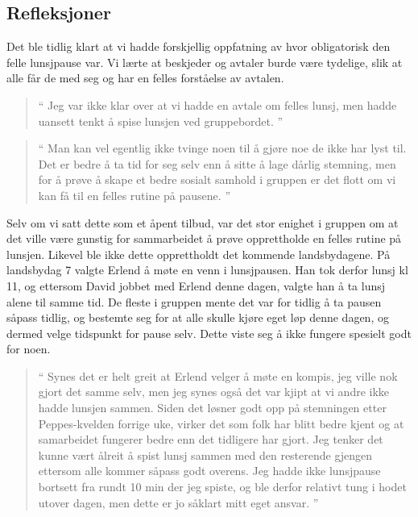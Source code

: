 \subsection*{Refleksjoner}
Det ble tidlig klart at vi hadde forskjellig oppfatning av hvor obligatorisk den felle lunsjpause var. Vi lærte at beskjeder og avtaler burde være tydelige, slik at alle får de med seg og har en felles forståelse av avtalen. 


\begin{quote}``
Jeg var ikke klar over at vi hadde en avtale om felles lunsj, men hadde uansett tenkt å spise lunsjen ved gruppebordet.
''\end{quote} 

\begin{quote}``
Man kan vel egentlig ikke tvinge noen til å gjøre noe de ikke har lyst til. Det er bedre å ta tid for seg selv enn å sitte å lage dårlig stemning, men for å prøve å skape et bedre sosialt samhold i gruppen er det flott om vi kan få til en felles rutine på pausene.
''\end{quote} 



Selv om vi satt dette som et åpent tilbud, var det stor enighet i gruppen om at det ville være gunstig for sammarbeidet å prøve opprettholde en felles rutine på lunsjen. Likevel ble ikke dette opprettholdt det kommende landsbydagene. På landsbydag 7 valgte Erlend å møte en venn i lunsjpausen. Han tok derfor lunsj kl 11, og ettersom David jobbet med Erlend denne dagen, valgte han å ta lunsj alene til samme tid. De fleste i gruppen mente det var for tidlig å ta pausen såpass tidlig, og bestemte seg for at alle skulle kjøre eget løp denne dagen, og dermed velge tidspunkt for pause selv. Dette viste seg å ikke fungere spesielt godt for noen. 



\begin{quote}``
Synes det er helt greit at Erlend velger å møte en kompis, jeg ville nok gjort det samme selv, men jeg synes også det var kjipt at vi andre ikke hadde lunsjen sammen. Siden det løsner godt opp på stemningen etter Peppes-kvelden forrige uke, virker det som folk har blitt bedre kjent og at samarbeidet fungerer bedre enn det tidligere har gjort. Jeg tenker det kunne vært ålreit å spist lunsj sammen med den resterende gjengen ettersom alle kommer såpass godt overens. Jeg hadde ikke lunsjpause bortsett fra rundt 10 min der jeg spiste, og ble derfor relativt tung i hodet utover dagen, men dette er jo såklart mitt eget ansvar.
''\end{quote} 

